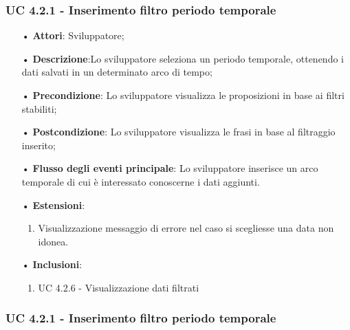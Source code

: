 \subsubsection{UC 4.2.1 - Inserimento filtro periodo temporale}
\begin{itemize}
\item[•]\textbf{Attori}: Sviluppatore;
\item[•]\textbf{Descrizione}:Lo sviluppatore seleziona un periodo temporale, ottenendo i dati salvati in un determinato arco di tempo;
\item[•]\textbf{Precondizione}: Lo sviluppatore visualizza le proposizioni in base ai filtri stabiliti;
\item[•]\textbf{Postcondizione}: Lo sviluppatore visualizza le frasi in base al filtraggio inserito;
\item[•]\textbf{Flusso degli eventi principale}: Lo sviluppatore inserisce un arco temporale di cui è interessato conoscerne i dati aggiunti.
\item[•]\textbf{Estensioni}: 
\begin{enumerate}
	\item Visualizzazione messaggio di errore nel caso si scegliesse una data non idonea.
\end{enumerate}
\item[•]\textbf{Inclusioni}:
\begin{enumerate}
\item UC 4.2.6 - Visualizzazione dati filtrati
\end{enumerate}
\end{itemize}

\subsubsection{UC 4.2.1 - Inserimento filtro periodo temporale}